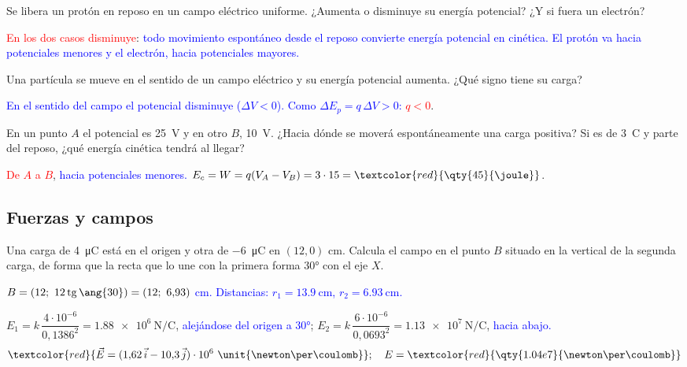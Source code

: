 \begin{exercise}
    Se libera un protón en reposo en un campo eléctrico uniforme. ¿Aumenta o disminuye su energía potencial? ¿Y si fuera un electrón?
    \begin{solu}
        \textcolor{red}{En los dos casos disminuye}: \textcolor{blue}{todo movimiento espontáneo desde el reposo convierte energía
        potencial en cinética. El protón va hacia potenciales menores y el electrón, hacia potenciales mayores.}
    \end{solu}
\end{exercise}

\begin{exercise}
    Una partícula se mueve en el sentido de un campo eléctrico y su energía potencial aumenta. ¿Qué signo tiene su carga?
    \begin{solu}
        \textcolor{blue}{En el sentido del campo el potencial disminuye (\(\Delta V < 0\)). Como \(\Delta E_p = q\,\Delta V > 0\):}
        \textcolor{red}{\(q < 0\)}.
    \end{solu}
\end{exercise}

\begin{exercise}
    En un punto \(A\) el potencial es \qty{25}{\volt} y en otro \(B\), \qty{10}{\volt}. ¿Hacia dónde se moverá espontáneamente una
    carga positiva? Si es de \qty{3}{\coulomb} y parte del reposo, ¿qué energía cinética tendrá al llegar?
    \begin{solu}
        \textcolor{red}{De \(A\) a \(B\)}, \textcolor{blue}{hacia potenciales menores.}
        \(E_c = W = q(V_A - V_B) = 3\cdot 15 = \textcolor{red}{\qty{45}{\joule}}\).
    \end{solu}
\end{exercise}

\subsection{Fuerzas y campos}

\begin{exercise}
    Una carga de \qty{4}{\micro\coulomb} está en el origen y otra de \qty{-6}{\micro\coulomb} en \((12, 0)\) cm. Calcula el campo
    en el punto \(B\) situado en la vertical de la segunda carga, de forma que la recta que lo une con la primera forma \ang{30}
    con el eje \(X\).
    \begin{solu}
        \textcolor{blue}{\(B = (12;\ 12\tg\ang{30}) = (12;\ 6{,}93)\) cm. Distancias: \(r_1 = \qty{13.9}{\cm}\), \(r_2 = \qty{6.93}{\cm}\).}

        \(E_1 = k\,\dfrac{4\cdot 10^{-6}}{0{,}1386^2} = \qty{1.88e6}{\newton\per\coulomb}\), \textcolor{blue}{alejándose del origen a \ang{30}};
        \(E_2 = k\,\dfrac{6\cdot 10^{-6}}{0{,}0693^2} = \qty{1.13e7}{\newton\per\coulomb}\), \textcolor{blue}{hacia abajo.}
        \[ \textcolor{red}{\vec E = (1{,}62\,\vec{i} - 10{,}3\,\vec{j})\cdot 10^6\ \unit{\newton\per\coulomb}};\quad E = \textcolor{red}{\qty{1.04e7}{\newton\per\coulomb}} \]
    \end{solu}
\end{exercise}

